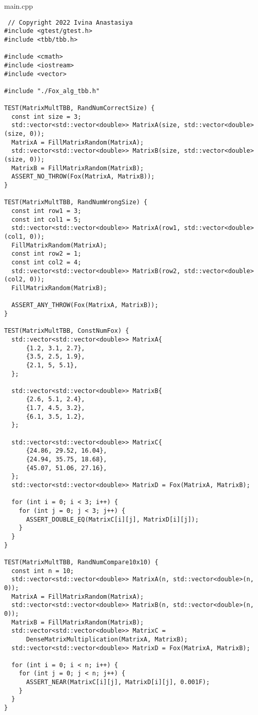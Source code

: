 \documentclass{report}
\begin{document}
 main.cpp
 \begin{lstlisting}
 // Copyright 2022 Ivina Anastasiya
#include <gtest/gtest.h>
#include <tbb/tbb.h>

#include <cmath>
#include <iostream>
#include <vector>

#include "./Fox_alg_tbb.h"

TEST(MatrixMultTBB, RandNumCorrectSize) {
  const int size = 3;
  std::vector<std::vector<double>> MatrixA(size, std::vector<double>(size, 0));
  MatrixA = FillMatrixRandom(MatrixA);
  std::vector<std::vector<double>> MatrixB(size, std::vector<double>(size, 0));
  MatrixB = FillMatrixRandom(MatrixB);
  ASSERT_NO_THROW(Fox(MatrixA, MatrixB));
}

TEST(MatrixMultTBB, RandNumWrongSize) {
  const int row1 = 3;
  const int col1 = 5;
  std::vector<std::vector<double>> MatrixA(row1, std::vector<double>(col1, 0));
  FillMatrixRandom(MatrixA);
  const int row2 = 1;
  const int col2 = 4;
  std::vector<std::vector<double>> MatrixB(row2, std::vector<double>(col2, 0));
  FillMatrixRandom(MatrixB);

  ASSERT_ANY_THROW(Fox(MatrixA, MatrixB));
}

TEST(MatrixMultTBB, ConstNumFox) {
  std::vector<std::vector<double>> MatrixA{
      {1.2, 3.1, 2.7},
      {3.5, 2.5, 1.9},
      {2.1, 5, 5.1},
  };

  std::vector<std::vector<double>> MatrixB{
      {2.6, 5.1, 2.4},
      {1.7, 4.5, 3.2},
      {6.1, 3.5, 1.2},
  };

  std::vector<std::vector<double>> MatrixC{
      {24.86, 29.52, 16.04},
      {24.94, 35.75, 18.68},
      {45.07, 51.06, 27.16},
  };
  std::vector<std::vector<double>> MatrixD = Fox(MatrixA, MatrixB);

  for (int i = 0; i < 3; i++) {
    for (int j = 0; j < 3; j++) {
      ASSERT_DOUBLE_EQ(MatrixC[i][j], MatrixD[i][j]);
    }
  }
}

TEST(MatrixMultTBB, RandNumCompare10x10) {
  const int n = 10;
  std::vector<std::vector<double>> MatrixA(n, std::vector<double>(n, 0));
  MatrixA = FillMatrixRandom(MatrixA);
  std::vector<std::vector<double>> MatrixB(n, std::vector<double>(n, 0));
  MatrixB = FillMatrixRandom(MatrixB);
  std::vector<std::vector<double>> MatrixC =
      DenseMatrixMultiplication(MatrixA, MatrixB);
  std::vector<std::vector<double>> MatrixD = Fox(MatrixA, MatrixB);

  for (int i = 0; i < n; i++) {
    for (int j = 0; j < n; j++) {
      ASSERT_NEAR(MatrixC[i][j], MatrixD[i][j], 0.001F);
    }
  }
}


\end{lstlisting}
\end{document}
